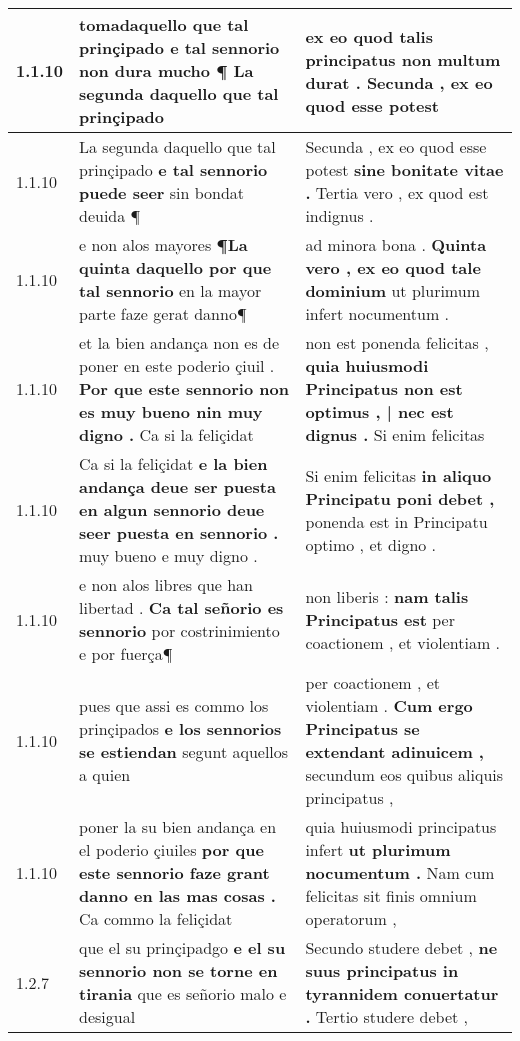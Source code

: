 \begin{tabular}{|p{1cm}|p{6.5cm}|p{6.5cm}|}

\hline
1.1.10 & tomadaquello que tal prinçipado \textbf{ e tal sennorio non dura mucho ¶ } La segunda daquello que tal prinçipado & ex eo quod talis principatus \textbf{ non multum durat . } Secunda , ex eo quod esse potest \\\hline
1.1.10 & La segunda daquello que tal prinçipado \textbf{ e tal sennorio puede seer } sin bondat deuida ¶ & Secunda , ex eo quod esse potest \textbf{ sine bonitate vitae . } Tertia vero , ex quod est indignus . \\\hline
1.1.10 & e non alos mayores \textbf{ ¶La quinta daquello por que tal sennorio } en la mayor parte faze gerat danno¶ & ad minora bona . \textbf{ Quinta vero , ex eo quod tale dominium } ut plurimum infert nocumentum . \\\hline
1.1.10 & et la bien andança non es de poner en este poderio çiuil . \textbf{ Por que este sennorio non es muy bueno nin muy digno . } Ca si la feliçidat & non est ponenda felicitas , \textbf{ quia huiusmodi Principatus non est optimus , | nec est dignus . } Si enim felicitas \\\hline
1.1.10 & Ca si la feliçidat \textbf{ e la bien andança deue ser puesta en algun sennorio deue seer puesta en sennorio . } muy bueno e muy digno . & Si enim felicitas \textbf{ in aliquo Principatu poni debet , } ponenda est in Principatu optimo , et digno . \\\hline
1.1.10 & e non alos libres que han libertad . \textbf{ Ca tal señorio es sennorio } por costrinimiento e por fuerça¶ & non liberis : \textbf{ nam talis Principatus est } per coactionem , et violentiam . \\\hline
1.1.10 & pues que assi es commo los prinçipados \textbf{ e los sennorios se estiendan } segunt aquellos a quien & per coactionem , et violentiam . \textbf{ Cum ergo Principatus se extendant adinuicem , } secundum eos quibus aliquis principatus , \\\hline
1.1.10 & poner la su bien andança en el poderio çiuiles \textbf{ por que este sennorio faze grant danno en las mas cosas . } Ca commo la feliçidat & quia huiusmodi principatus infert \textbf{ ut plurimum nocumentum . } Nam cum felicitas sit finis omnium operatorum , \\\hline
1.2.7 & que el su prinçipadgo \textbf{ e el su sennorio non se torne en tirania } que es señorio malo e desigual & Secundo studere debet , \textbf{ ne suus principatus in tyrannidem conuertatur . } Tertio studere debet , \\\hline

\end{tabular}
